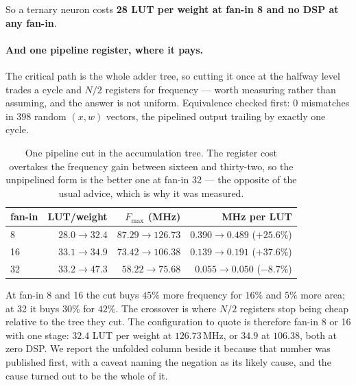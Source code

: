 So a ternary neuron costs \textbf{28 LUT per weight at fan-in 8 and no DSP at
any fan-in}.

\paragraph{And one pipeline register, where it pays.} The critical path is the
whole adder tree, so cutting it once at the halfway level trades a cycle and
$N/2$ registers for frequency --- worth measuring rather than assuming, and the
answer is not uniform. Equivalence checked first: $0$ mismatches in $398$ random
$(x,w)$ vectors, the pipelined output trailing by exactly one cycle.

\begin{table}[t]\centering
\caption{One pipeline cut in the accumulation tree. The register cost overtakes
the frequency gain between sixteen and thirty-two, so the unpipelined form is
the better one at fan-in 32 --- the opposite of the usual advice, which is why it
was measured.}
\label{tab:nodepipe}
\begin{tabular}{lrrr}
\toprule
fan-in & LUT/weight & $F_{\max}$ (MHz) & MHz per LUT \\
\midrule
8  & $28.0\to\mathbf{32.4}$ & $87.29\to\mathbf{126.73}$ & $0.390\to0.489$ (\textbf{$+25.6\%$}) \\
16 & $33.1\to\mathbf{34.9}$ & $73.42\to\mathbf{106.38}$ & $0.139\to0.191$ (\textbf{$+37.6\%$}) \\
32 & $33.2\to47.3$ & $58.22\to75.68$ & $0.055\to0.050$ ($-8.7\%$) \\
\bottomrule
\end{tabular}
\end{table}

At fan-in 8 and 16 the cut buys $45\%$ more frequency for $16\%$ and $5\%$ more
area; at 32 it buys $30\%$ for $42\%$. The crossover is where $N/2$ registers
stop being cheap relative to the tree they cut. The configuration to quote is
therefore fan-in 8 or 16 with one stage: $32.4$ LUT per weight at $126.73$\,MHz,
or $34.9$ at $106.38$, both at zero DSP. We report the unfolded column beside it because that number was
published first, with a caveat naming the negation as its likely cause, and the
cause turned out to be the whole of it.


